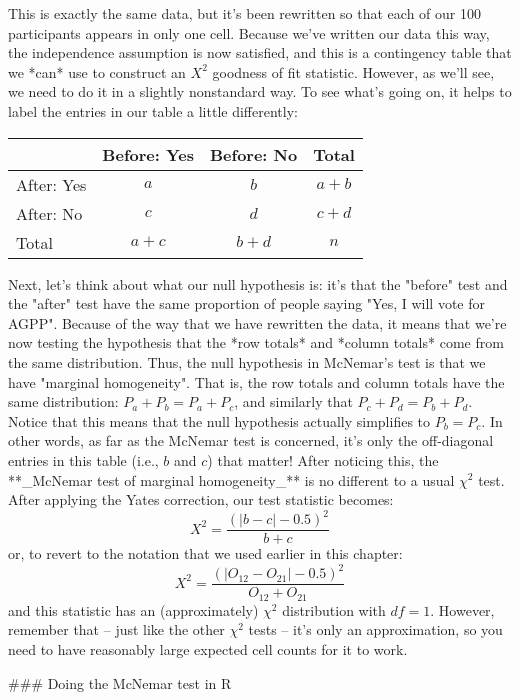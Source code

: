 This is exactly the same data, but it's been rewritten so that each of our 100 participants appears in only one cell. Because we've written our data this way, the independence assumption is now satisfied, and this is a contingency table that we *can* use to construct an $X^2$ goodness of fit statistic. However, as we'll see, we need to do it in a slightly nonstandard way. To see what's going on, it helps to label the entries in our table a little differently:
\begin{center}
\begin{tabular}{l|cc|c}
& Before: Yes & Before: No & Total \\ \hline
After: Yes   & $a$ & $b$ & $a+b$ \\
After: No & $c$ & $d$ & $c+d$ \\ \hline
Total & $a+c$ & $b+d$ & $n$
\end{tabular}
\end{center}

Next, let's think about what our null hypothesis is: it's that the "before" test and the "after" test have the same proportion of people saying "Yes, I will vote for AGPP". Because of the way that we have rewritten the data, it means that we're now testing the hypothesis that the *row totals* and *column totals* come from the same distribution. Thus, the null hypothesis in McNemar's test is that we have "marginal homogeneity". That is, the row totals and column totals have the same distribution: $P_a + P_b = P_a + P_c$, and similarly that $P_c + P_d = P_b + P_d$. Notice that this means that the null hypothesis actually simplifies to $P_b = P_c$. In other words, as far as the McNemar test is concerned, it's only the off-diagonal entries in this table (i.e., $b$ and $c$) that matter! After noticing this, the **_McNemar test of marginal homogeneity_** is no different to a usual $\chi^2$ test. After applying the Yates correction, our test statistic becomes:
$$
X^2 = \frac{(|b-c| - 0.5)^2}{b+c}
$$
or, to revert to the notation that we used earlier in this chapter:
$$
X^2 = \frac{(|O_{12}-O_{21}| - 0.5)^2}{O_{12} + O_{21}}
$$
and this statistic has an (approximately) $\chi^2$ distribution with $df=1$. However, remember that -- just like the other $\chi^2$ tests -- it's only an approximation, so you need to have reasonably large expected cell counts for it to work.


### Doing the McNemar test in R

